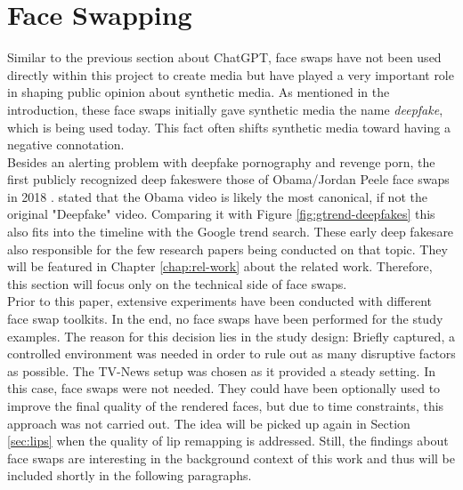 \documentclass[
  a4paper,  %
  twoside,  %
  bibliography=totoc,
  headsepline,
  cleardoublepage=empty,
  parskip=half,
  draft=false
]{scrbook}
\begin{document}
\section{Face Swapping}
\label{sec:face-swapping}
Similar to the previous section about ChatGPT, face swaps have not been used directly within this project to create media but have played a very important role in shaping public opinion about synthetic media. As mentioned in the introduction, these face swaps initially gave synthetic media the name \textit{deepfake}, which is being used today. This fact often shifts synthetic media toward having a negative connotation. \\
Besides an alerting problem with deepfake pornography and revenge porn, the first publicly recognized deep fakeswere those of Obama/Jordan Peele face swaps in 2018 \cite{vincentWatchJordanPeele2018}. \citet{hancockSocialImpactDeepfakes2021} stated that the Obama video is likely the most canonical, if not the original "Deepfake" video.
Comparing it with Figure \ref{fig:gtrend-deepfakes} this also fits into the timeline with the Google trend search. These early deep fakesare also responsible for the few research papers being conducted on that topic. They will be featured in Chapter \ref{chap:rel-work} about the related work. Therefore, this section will focus only on the technical side of face swaps. \\
Prior to this paper, extensive experiments have been conducted with different face swap toolkits. In the end, no face swaps have been performed for the study examples. The reason for this decision lies in the study design: Briefly captured, a controlled environment was needed in order to rule out as many disruptive factors as possible. The TV-News setup was chosen as it provided a steady setting. In this case, face swaps were not needed. They could have been optionally used to improve the final quality of the rendered faces, but due to time constraints, this approach was not carried out. The idea will be picked up again in Section \ref{sec:lips} when the quality of lip remapping is addressed.
Still, the findings about face swaps are interesting in the background context of this work and thus will be included shortly in the following paragraphs.
\end{document}
